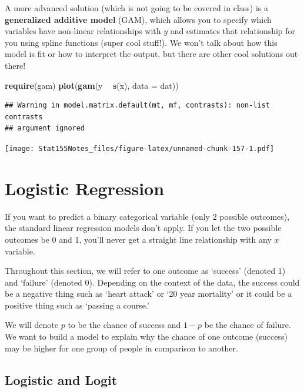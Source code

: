 \documentclass[]{book}
\newenvironment{Shaded}{\begin{snugshade}}{\end{snugshade}}
\newcommand{\DataTypeTok}[1]{\textcolor[rgb]{0.13,0.29,0.53}{#1}}
\newcommand{\KeywordTok}[1]{\textcolor[rgb]{0.13,0.29,0.53}{\textbf{#1}}}
\newcommand{\NormalTok}[1]{#1}
\newcommand{\OperatorTok}[1]{\textcolor[rgb]{0.81,0.36,0.00}{\textbf{#1}}}
\newcommand{\StringTok}[1]{\textcolor[rgb]{0.31,0.60,0.02}{#1}}
\begin{document}
A more advanced solution (which is not going to be covered in class) is a \textbf{generalized additive model} (GAM), which allows you to specify which variables have non-linear relationships with \(y\) and estimates that relationship for you using spline functions (super cool stuff!). We won't talk about how this model is fit or how to interpret the output, but there are other cool solutions out there!

\begin{Shaded}
\begin{Highlighting}[]
\KeywordTok{require}\NormalTok{(gam)}
\KeywordTok{plot}\NormalTok{(}\KeywordTok{gam}\NormalTok{(y }\OperatorTok{~}\StringTok{ }\KeywordTok{s}\NormalTok{(x), }\DataTypeTok{data =}\NormalTok{ dat))}
\end{Highlighting}
\end{Shaded}

\begin{verbatim}
## Warning in model.matrix.default(mt, mf, contrasts): non-list contrasts
## argument ignored
\end{verbatim}

\texttt{[image: Stat155Notes\_files/figure-latex/unnamed-chunk-157-1.pdf]}

\hypertarget{logistic-regression}{%
\section{Logistic Regression}\label{logistic-regression}}

If you want to predict a binary categorical variable (only 2 possible outcomes), the standard linear regression models don't apply. If you let the two possible outcomes be 0 and 1, you'll never get a straight line relationship with any \(x\) variable.

Throughout this section, we will refer to one outcome as `success' (denoted 1) and `failure' (denoted 0). Depending on the context of the data, the success could be a negative thing such as `heart attack' or `20 year mortality' or it could be a positive thing such as `passing a course.'

We will denote \(p\) to be the chance of success and \(1- p\) be the chance of failure. We want to build a model to explain why the chance of one outcome (success) may be higher for one group of people in comparison to another.

\hypertarget{logistic-and-logit}{%
\subsection{Logistic and Logit}\label{logistic-and-logit}}
\end{document}
